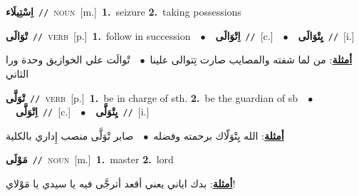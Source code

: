 \documentclass[10pt,a4paper,twoside]{article} %
\begin{document}
\begin{multicols}{2}
{\setlength\topsep{0pt}\textbf{\foreignlanguage{arabic}{اِسْتِيلَاء}}\ {\color{gray}\texttt{//}\color{black}}\ \textsc{noun}\ [m.]\ \textbf{1.}~seizure  \textbf{2.}~taking possessions\ } \vspace{2mm}

{\setlength\topsep{0pt}\textbf{\foreignlanguage{arabic}{تْوَالَى}}\ {\color{gray}\texttt{//}\color{black}}\ \textsc{verb}\ [p.]\ \textbf{1.}~follow in succession\ \ $\bullet$\ \ \setlength\topsep{0pt}\textbf{\foreignlanguage{arabic}{اِتْوَالَى}}\ {\color{gray}\texttt{//}\color{black}}\ [c.]\ \ $\bullet$\ \ \setlength\topsep{0pt}\textbf{\foreignlanguage{arabic}{يِتْوَالَى}}\ {\color{gray}\texttt{//}\color{black}}\ [i.]\  \begin{flushright}\color{gray}\foreignlanguage{arabic}{\textbf{\underline{\foreignlanguage{arabic}{أمثلة}}}: من لما شفته والمصايب صارت تِتوالى علينا\ $\bullet$\ \  تْوالَت علي الخوازيق وحدة ورا الثاني}\end{flushright}\color{black}} \vspace{2mm}

{\setlength\topsep{0pt}\textbf{\foreignlanguage{arabic}{تْوَلَّى}}\ {\color{gray}\texttt{//}\color{black}}\ \textsc{verb}\ [p.]\ \textbf{1.}~be in charge of sth.  \textbf{2.}~be the guardian of sb\ \ $\bullet$\ \ \setlength\topsep{0pt}\textbf{\foreignlanguage{arabic}{اِتْوَلَّى}}\ {\color{gray}\texttt{//}\color{black}}\ [c.]\ \ $\bullet$\ \ \setlength\topsep{0pt}\textbf{\foreignlanguage{arabic}{يِتْوَلَّى}}\ {\color{gray}\texttt{//}\color{black}}\ [i.]\  \begin{flushright}\color{gray}\foreignlanguage{arabic}{\textbf{\underline{\foreignlanguage{arabic}{أمثلة}}}: الله يِتْوَلّاك برحمته وفضله\ $\bullet$\ \  صابر تْوَلَّى منصب إِداري بالكلية}\end{flushright}\color{black}} \vspace{2mm}

{\setlength\topsep{0pt}\textbf{\foreignlanguage{arabic}{مَوْلَى}}\ {\color{gray}\texttt{//}\color{black}}\ \textsc{noun}\ [m.]\ \textbf{1.}~master  \textbf{2.}~lord\  \begin{flushright}\color{gray}\foreignlanguage{arabic}{\textbf{\underline{\foreignlanguage{arabic}{أمثلة}}}: بدك اياني يعني أقعد أترجَّى فيه يا سيدي يا مَوْلاي!}\end{flushright}\color{black}} \vspace{2mm}


\end{multicols}
\end{document}
